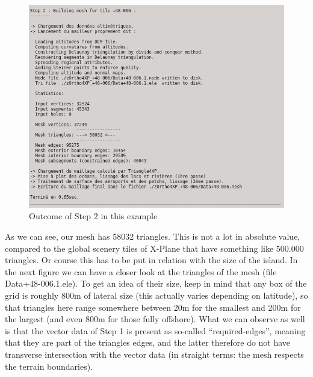 \documentclass[12pt]{article}
\begin{document}
\begin{center}
\begin{figure}[!ht]
\begin{center}
\includegraphics[width=14cm]{Images/ouessant_step2.png}
\caption{\label{fig:text_step2}Outcome of Step 2 in this example}
\end{center}
\end{figure}
\end{center}

As we can see, our mesh has 58032 triangles. This is not a lot in absolute value, compared to the global scenery tiles of X-Plane that have something like 500.000 triangles.  Or course this has to be put in relation with the size of the island. In the next figure we can have a closer look at the triangles of the mesh (file Data+48-006.1.ele). To get an idea of their size, keep in mind that any box of the grid is roughly 800m of lateral size (this actually varies depending on latitude), so that triangles here range somewhere between 20m for the smallest and 200m for the largest (and even 800m for those fully offshore).
What we can observe as well is that the vector data of Step 1 is present as so-called ``required-edges'', meaning that they are part of the triangles edges, and the latter therefore do not have transverse intersection with the vector data (in straight terms: the mesh respects the terrain boundaries).
\end{document}
